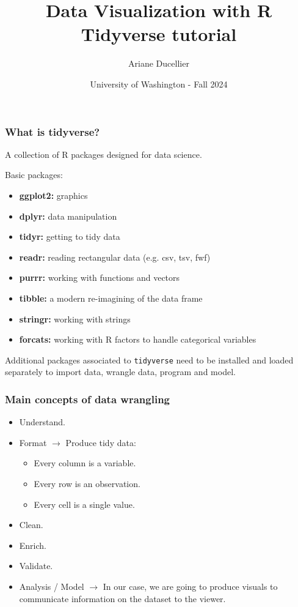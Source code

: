 \documentclass{beamer}
\title[Data Visualization with R - Tidyverse tutorial]{Data Visualization with R \\ Tidyverse tutorial}
\author{Ariane Ducellier}
\date{University of Washington - Fall 2024}
\begin{document}
	\begin{frame}
		\titlepage
	\end{frame}

	\begin{frame}[fragile]
		\frametitle{What is tidyverse?}

		A collection of R packages designed for data science.

		\vspace{1em}

		Basic packages:
		\begin{itemize}
			\item \textbf{ggplot2:} graphics
			\item \textbf{dplyr:} data manipulation
			\item \textbf{tidyr:} getting to tidy data
			\item \textbf{readr:} reading rectangular data (e.g. csv, tsv, fwf)
			\item \textbf{purrr:} working with functions and vectors
			\item \textbf{tibble:} a modern re-imagining of the data frame
			\item \textbf{stringr:} working with strings
			\item \textbf{forcats:} working with R factors to handle categorical variables
		\end{itemize}

		\vspace{1em}

		Additional packages associated to \verb|tidyverse| need to be installed and loaded separately to import data, wrangle data, program and model.		
		
	\end{frame}

	\begin{frame}
		\frametitle{Main concepts of data wrangling}

		\begin{itemize}
		\setlength{\itemsep}{1em}
			\item Understand.
			\item Format $\rightarrow$ Produce tidy data:
			\begin{itemize}
				\item Every column is a variable.
				\item Every row is an observation.
				\item Every cell is a single value.
			\end{itemize}
			\item Clean.
			\item Enrich.
			\item Validate.
			\item Analysis / Model $\rightarrow$ In our case, we are going to produce visuals to communicate information on the dataset to the viewer.
		\end{itemize}

	\end{frame}
\end{document}
